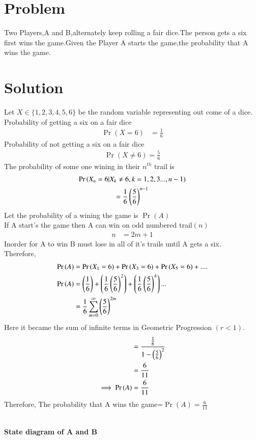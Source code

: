 \documentclass[journal,12pt,twocolumn]{IEEEtran}
\begin{document}
\section{Problem}
Two Players,A and B,alternately keep rolling a fair dice.The person gets a six first wins the game.Given the Player A starts the game,the probability that A wins the game.
\section{Solution}
Let $X\in\{1,2,3,4,5,6\}$ be the random variable representing out come of a dice.\\
Probability of getting a six on a fair dice
\begin{align}
\Pr(X=6) &=\frac{1}{6}
\end{align}
Probability of not getting a six on a fair dice
\begin{align}
\Pr(X\neq6)=\frac{5}{6}
\end{align}
The probability of some one wining in their $n^{th}$ trail is
    \begin{multline}
        \Pr{(X_n=6|X_k\neq6,k=1,2,3...,n-1)}\\
    =\frac{1}{6}\left(\frac{5}{6}\right)^{n-1}
    \end{multline}
Let the probability of a wining the game is $\Pr{(A)}$\\
If A start's the game then A can win on odd numbered trail$(n)$\\
\begin{align}
n&=2m+1
\end{align}
Inorder for A to win B must lose in all of it's trails until A gets a six.\\
Therefore,
\begin{align}
   \Pr{(A)}&=\Pr{(X_1=6)}+\Pr{(X_3=6)}+\Pr{(X_5=6)}+....\\
    \Pr{(A)}&=\left(\frac{1}{6}\right)+\left(\frac{1}{6}\left(\frac{5}{6}\right)^{2}\right)+\left(\frac{1}{6}\left(\frac{5}{6}\right)^{4}\right)...\\
    &=\frac{1}{6}\sum_{m=0}^{\infty}\left(\frac{5}{6}\right)^{2m}
\end{align}
Here it became the sum of infinite terms in Geometric Progression $(r<1)$.\\
\begin{align}
    &=\frac{\frac{1}{6}}{1-\left(\frac{5}{6}\right)^2}\\
    &=\frac{6}{11}\\
    \implies \Pr{(A)}&=\frac{6}{11}
\end{align}
Therefore, The probability that A wins the game=$\Pr{(A)=\frac{6}{11}}$
\\
\\
\centerline{ \textbf{State diagram of A and B}}
\end{document}

